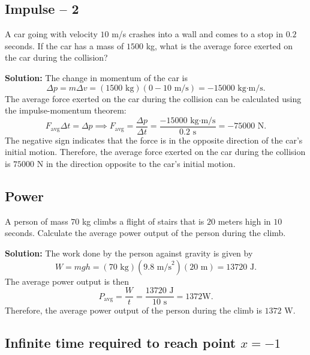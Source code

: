 \documentclass[12pt]{article}
\begin{document}
\subsection{Impulse -- 2}
A car going with velocity $10$ m/s crashes into a wall and comes to a stop in $0.2$ seconds. If the car has a mass of $1500$ kg, what is the average force exerted on the car during the collision?

\textbf{Solution:} The change in momentum of the car is
\begin{equation}
\Delta p = m \Delta v = (1500 \text{ kg})(0 - 10 \text{ m/s}) = -15000 \text{ kg·m/s}.
\end{equation}
The average force exerted on the car during the collision can be calculated using the impulse-momentum theorem:
\begin{equation}
F_{\text{avg}} \Delta t = \Delta p \implies F_{\text{avg}} = \frac{\Delta p}{\Delta t} = \frac{-15000 \text{ kg·m/s}}{0.2 \text{ s}} = -75000 \text{ N}.
\end{equation}
The negative sign indicates that the force is in the opposite direction of the car's initial motion. Therefore, the average force exerted on the car during the collision is $\boxed{75000 \text{ N}}$ in the direction opposite to the car's initial motion.

\subsection{Power}
A person of mass $70$ kg climbs a flight of stairs that is $20$ meters high in $10$ seconds. Calculate the average power output of the person during the climb. 

\textbf{Solution:} The work done by the person against gravity is given by
\begin{equation}
W = mgh = (70 \text{ kg})(9.8 \text{ m/s}^2)(20 \text{ m}) = 13720 \text{ J}.
\end{equation}
The average power output is then
\begin{equation}
P_{\text{avg}} = \frac{W}{t} = \frac{13720 \text{ J}}{10 \text{ s}} = 1372 \text{W}.
\end{equation}
Therefore, the average power output of the person during the climb is $\boxed{1372 \text{ W}}$.

\subsection{Infinite time required to reach point $x=-1$}
\end{document}
